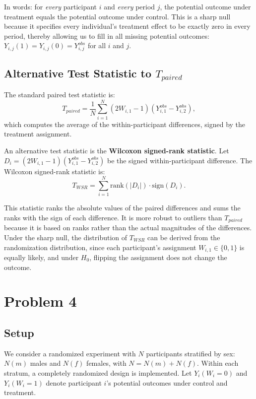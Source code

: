 \documentclass[11pt]{article}
\begin{document}
In words: for \textit{every} participant $i$ and \textit{every} period $j$, the potential outcome under treatment equals the potential outcome under control. This is a sharp null because it specifies every individual's treatment effect to be exactly zero in every period, thereby allowing us to fill in all missing potential outcomes: $Y_{i,j}(1) = Y_{i,j}(0) = Y_{i,j}^{obs}$ for all $i$ and $j$.

\subsection*{Alternative Test Statistic to $T_{paired}$}

The standard paired test statistic is:
\[
  T_{paired} = \frac{1}{N} \sum_{i=1}^{N} (2W_{i,1} - 1)\left(Y_{i,1}^{obs} - Y_{i,2}^{obs}\right),
\]
which computes the average of the within-participant differences, signed by the treatment assignment.

An alternative test statistic is the \textbf{Wilcoxon signed-rank statistic}. Let $D_i = (2W_{i,1} - 1)(Y_{i,1}^{obs} - Y_{i,2}^{obs})$ be the signed within-participant difference. The Wilcoxon signed-rank statistic is:
\[
  T_{WSR} = \sum_{i=1}^{N} \text{rank}(|D_i|) \cdot \text{sign}(D_i).
\]

This statistic ranks the absolute values of the paired differences and sums the ranks with the sign of each difference. It is more robust to outliers than $T_{paired}$ because it is based on ranks rather than the actual magnitudes of the differences. Under the sharp null, the distribution of $T_{WSR}$ can be derived from the randomization distribution, since each participant's assignment $W_{i,1} \in \{0, 1\}$ is equally likely, and under $H_0$, flipping the assignment does not change the outcome.

\newpage
\section*{Problem 4}

\subsection*{Setup}

We consider a randomized experiment with $N$ participants stratified by sex: $N(m)$ males and $N(f)$ females, with $N = N(m) + N(f)$. Within each stratum, a completely randomized design is implemented. Let $Y_i(W_i = 0)$ and $Y_i(W_i = 1)$ denote participant $i$'s potential outcomes under control and treatment.
\end{document}
